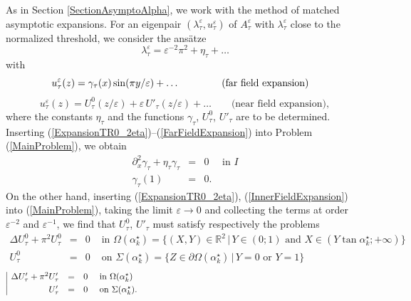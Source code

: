 \documentclass[11pt,a4paper]{article}
\newcommand{\eps}{\varepsilon}
\newcommand{\Om}{\Omega}
\newcommand{\R}{\mathbb{R}}
\begin{document}
As in Section \ref{SectionAsymptoAlpha}, we work with the method of matched asymptotic expansions. For an eigenpair $(\lambda^\eps_\tau,u^\eps_\tau)$ of $A^\eps_\tau$ with $\lambda^\eps_\tau$ close to the normalized threshold, we consider the ans\"atze
\begin{equation}\label{ExpansionTR0_2eta}
\lambda^\eps_\tau=\eps^{-2}\pi^2+\eta_\tau+\dots
\end{equation}
with 
\begin{equation}\label{FarFieldExpansion}
u^\eps_\tau(z)=\gamma_\tau(x)\sin(\pi y/\eps)+\dots\hspace{0.8cm}\qquad\mbox{(far field expansion)\hspace{0.35cm}}
\end{equation}
\begin{equation}\label{InnerFieldExpansion}
u^\eps_\tau(z)=U^0_{\tau}(z/\eps)+\eps\,U'_{\tau}(z/\eps)+\dots\qquad\mbox{(near field expansion)},
\end{equation}
where the constants $\eta_\tau$ and the functions $\gamma_\tau$, $U^0_\tau$, $U'_\tau$ are to be determined.\\
\newline
Inserting (\ref{ExpansionTR0_2eta})--(\ref{FarFieldExpansion}) into Problem (\ref{MainProblem}), we obtain 
\[
\begin{array}{|rcl}
\partial^2_x\gamma_\tau+\eta_\tau\gamma_\tau&=&0\quad\mbox{ in }I\\[3pt]
\gamma_\tau(1)&=&0.
\end{array}
\]
On the other hand, inserting (\ref{ExpansionTR0_2eta}), (\ref{InnerFieldExpansion}) into (\ref{MainProblem}), taking the limit $\eps\to0$ and collecting the terms at order $\eps^{-2}$ and $\eps^{-1}$, we find that $U^0_{\tau}$, $U'_{\tau}$ must satisfy respectively the problems
\begin{equation}\label{NearField1}
\begin{array}{|rcll}
\Delta U^0_\tau+\pi^2U^0_\tau&=&0&\mbox{ in }\Om(\alpha^\star_k)=\{(X,Y)\in \R^2\,|\,Y\in(0;1)\mbox{ and }X\in (Y\tan\alpha^\star_k;+\infty)\}\\[3pt]
U^0_\tau&=&0&\mbox{ on }\Sigma(\alpha^\star_k)=\{Z\in\partial\Om(\alpha^\star_k)\,|\,Y=0\mbox{ or }Y=1\}
\end{array}
\end{equation}
\begin{equation}\label{NearFieldP}
\begin{array}{|rcll}
\Delta U'_\tau+\pi^2U'_\tau&=&0&\mbox{ in }\Om(\alpha^\star_k)\\[3pt]
U'_\tau&=&0&\mbox{ on }\Sigma(\alpha^\star_k).
\end{array}\hspace{8.9cm}
\end{equation}
\end{document}
